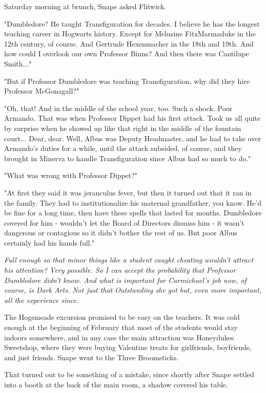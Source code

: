 Saturday morning at brunch, Snape asked Flitwick.

"Dumbledore? He taught Transfiguration for decades. I believe he has the longest teaching career in Hogwarts history. Except for Melusine FitzMarmaduke in the 12th century, of course. And Gertrude Hexenmacher in the 18th and 19th. And how could I overlook our own Professor Binns? And then there was Cantilupe Smith..."

"But if Professor Dumbledore was teaching Transfiguration, why did they hire Professor McGonagall?"

"Oh, that! And in the middle of the school year, too. Such a shock. Poor Armando. That was when Professor Dippet had his first attack. Took us all quite by surprise when he showed up like that right in the middle of the fountain court... Dear, dear. Well, Albus was Deputy Headmaster, and he had to take over Armando's duties for a while, until the attack subsided, of course, and they brought in Minerva to handle Transfiguration since Albus had so much to do."

"What was wrong with Professor Dippet?"

"At first they said it was jeranculus fever, but then it turned out that it ran in the family. They had to institutionalize his maternal grandfather, you know. He'd be fine for a long time, then have these spells that lasted for months. Dumbledore covered for him - wouldn't let the Board of Directors dismiss him - it wasn't dangerous or contagious so it didn't bother the rest of us. But poor Albus certainly had his hands full."

\emph{Full enough so that minor things like a student caught cheating wouldn't attract his attention? Very possible. So I can accept the probability that Professor Dumbledore didn't know. And what is important for Carmichael's job now, of course, is Dark Arts. Not just that Outstanding she got but, even more important, all the experience since.}

The Hogsmeade excursion promised to be easy on the teachers. It was cold enough at the beginning of February that most of the students would stay indoors somewhere, and in any case the main attraction was Honeydukes Sweetshop, where they were buying Valentine treats for girlfriends, boyfriends, and just friends. Snape went to the Three Broomsticks.

That turned out to be something of a mistake, since shortly after Snape settled into a booth at the back of the main room, a shadow covered his table.

